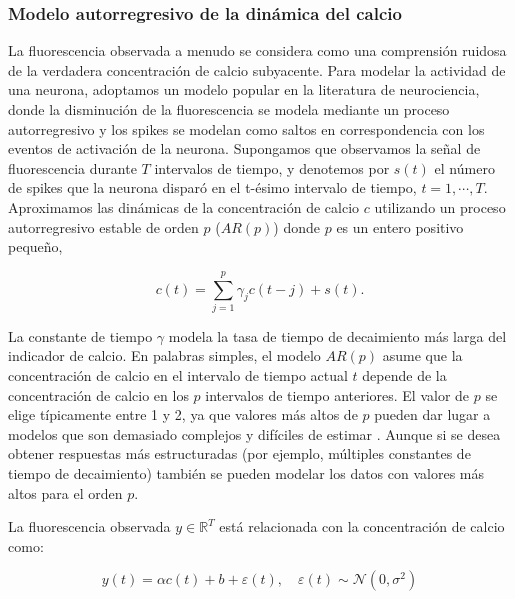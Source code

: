 \subsubsection{Modelo autorregresivo de la dinámica del calcio}

La fluorescencia observada a menudo se considera como una comprensión ruidosa de la verdadera concentración de calcio subyacente.  Para modelar la actividad de una neurona, adoptamos un modelo popular en la literatura de neurociencia, donde la disminución de la fluorescencia se modela mediante un proceso autorregresivo y los spikes se modelan como saltos en correspondencia con los eventos de activación de la neurona.  Supongamos  que observamos la señal de fluorescencia durante $T$ intervalos de tiempo, y denotemos por $s(t)$ el número de spikes que la neurona disparó en el t-ésimo intervalo de tiempo, $t =1,\cdots, T$. Aproximamos las dinámicas de la concentración de calcio $c$ utilizando un proceso autorregresivo estable de orden $p$ ($AR(p)$) donde $p$ es un entero positivo pequeño,

\begin{equation}\label{eq:85}
	c(t)=\sum_{j=1}^{p}\gamma_jc\left(t-j\right)+s(t).
\end{equation}

La constante de tiempo $\gamma$ modela la tasa de tiempo de decaimiento más larga del indicador de calcio.  En palabras simples, el modelo $AR(p)$ asume que la concentración de calcio en el intervalo de tiempo actual $t$ depende de la concentración de calcio en los $p$ intervalos de tiempo anteriores. El valor de $p$ se elige típicamente entre 1 y 2, ya que valores más altos de $p$ pueden dar lugar a modelos que son demasiado complejos y difíciles de estimar \cite{pnevmatikakis_simultaneous_2016}.  Aunque  si se desea obtener  respuestas más estructuradas (por ejemplo, múltiples constantes de tiempo de decaimiento) también se pueden modelar los datos con valores más altos para el orden $p$. 

 La fluorescencia observada $y\in\mathbb{R}^T$ está relacionada con la concentración de calcio como:
 
 \begin{equation}\label{eq:86}
 	y(t)=\alpha c(t) + b  + \varepsilon(t), \quad \varepsilon(t) \sim \mathcal{N}(0,\sigma^2)
 \end{equation}
 

